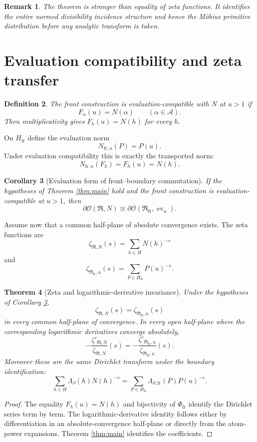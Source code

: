 \documentclass[11pt]{article}
\newcommand{\cR}{\mathfrak R}
\newcommand{\cA}{\mathcal A}
\newcommand{\cO}{\mathcal O}
\newcommand{\fr}{\mathrm{fr}}
\newcommand{\bd}{\partial}
\newcommand{\Lam}{\Lambda}
\newtheorem{theorem}{Theorem}[section]
\newtheorem{corollary}[theorem]{Corollary}
\newtheorem{definition}[theorem]{Definition}
\newtheorem{remark}[theorem]{Remark}
\begin{document}
\begin{remark}
The theorem is stronger than equality of zeta functions. It identifies the entire normed divisibility incidence structure and hence the M\"obius primitive distribution before any analytic transform is taken.
\end{remark}

\section{Evaluation compatibility and zeta transfer}

\begin{definition}
The front construction is \emph{evaluation-compatible} with $N$ at $u>1$ if
\[
F_\alpha(u)=N(\alpha)
\qquad(\alpha\in\cA).
\]
Then multiplicativity gives $F_h(u)=N(h)$ for every $h$.
\end{definition}

On $H_{\fr}$ define the evaluation norm
\[
N_{\fr,u}(P)=P(u).
\]
Under evaluation compatibility this is exactly the transported norm:
\[
N_{\fr,u}(F_h)=F_h(u)=N(h).
\]

\begin{corollary}[Evaluation form of front--boundary commutation]\label{cor:eval}
If the hypotheses of Theorem \ref{thm:main} hold and the front construction is evaluation-compatible at $u>1$, then
\[
\boxed{
\bd\cO(\cR,N)
\cong
\bd\cO(\cR_{\fr},\operatorname{ev}_u).}
\]
\end{corollary}

Assume now that a common half-plane of absolute convergence exists. The zeta functions are
\[
\zeta_{\cR,N}(s)=\sum_{h\in H}N(h)^{-s}
\]
and
\[
\zeta_{\cR_{\fr},u}(s)
=
\sum_{P\in H_{\fr}}P(u)^{-s}.
\]

\begin{theorem}[Zeta and logarithmic-derivative invariance]\label{thm:zeta}
Under the hypotheses of Corollary \ref{cor:eval},
\[
\boxed{
\zeta_{\cR,N}(s)
=
\zeta_{\cR_{\fr},u}(s)}
\]
in every common half-plane of convergence. In every open half-plane where the corresponding logarithmic derivatives converge absolutely,
\[
\boxed{
-\frac{\zeta'_{\cR,N}}{\zeta_{\cR,N}}(s)
=
-\frac{\zeta'_{\cR_{\fr},u}}{\zeta_{\cR_{\fr},u}}(s).}
\]
Moreover these are the same Dirichlet transform under the boundary identification:
\[
\sum_{h\in H}\Lam_{\bd}(h)N(h)^{-s}
=
\sum_{P\in H_{\fr}}\Lam_{\bd,\fr}(P)P(u)^{-s}.
\]
\end{theorem}

\begin{proof}
The equality $F_h(u)=N(h)$ and bijectivity of $\Phi_{\fr}$ identify the Dirichlet series term by term. The logarithmic-derivative identity follows either by differentiation in an absolute-convergence half-plane or directly from the atom-power expansions. Theorem \ref{thm:main} identifies the coefficients.
\end{proof}
\end{document}
